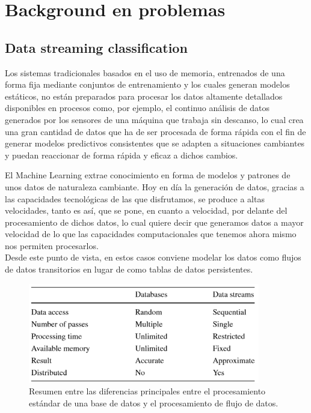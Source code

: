 \chapter[Capítulo 2. Background en problemas]{Background en problemas}

\section{Data streaming classification}

Los sistemas tradicionales basados en el uso de memoria, entrenados de una forma fija mediante conjuntos de entrenamiento y los cuales generan modelos estáticos, no están
preparados para procesar los datos altamente detallados disponibles en procesos como, por ejemplo, el continuo análisis de datos generados por los sensores de una máquina que trabaja sin descanso, lo cual crea una gran cantidad de datos que ha de ser procesada de forma rápida con el fin de generar modelos predictivos consistentes
que se adapten a situaciones cambiantes y puedan reaccionar de forma rápida y eficaz a dichos cambios.

El Machine Learning extrae conocimiento en forma de modelos y patrones de unos datos de naturaleza cambiante. Hoy en día la generación de datos, gracias a las capacidades
tecnológicas de las que disfrutamos, se produce a altas velocidades, tanto es así, que se pone, en cuanto a velocidad, por delante del procesamiento de dichos datos, lo cual
quiere decir que generamos datos a mayor velocidad de lo que las capacidades computacionales que tenemos ahora mismo nos permiten procesarlos.\\
Desde este punto de vista, en estos casos conviene modelar los datos como flujos de datos transitorios en lugar de como tablas de datos persistentes.

\begin{figure}[H]
	\centering
	\includegraphics[width=0.9\textwidth]{imagenes/tabla1} 
	\caption{Resumen entre las diferencias principales entre el procesamiento estándar de una base de datos y el procesamiento de flujo de datos. \cite{ref1}}
\end{figure}



